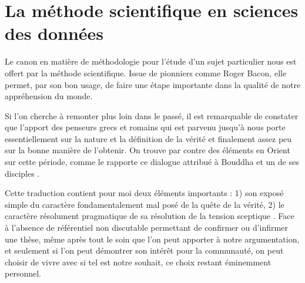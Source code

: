 \chapter{ \nmu La méthode scientifique en sciences des données} \label{chap:methode}

Le canon en matière de méthodologie pour l'étude d'un sujet particulier nous est offert par la méthode scientifique. Issue de pionniers comme Roger Bacon\cite{bacon1878novum}, elle permet, par son bon usage, de faire une étape importante dans la qualité de notre appréhension du monde.

Si l'on cherche à remonter plus loin dans le passé, il est remarquable de constater que l'apport des penseurs grecs et romains qui est parvenu jusqu'à nous porte essentiellement sur la nature et la définition de la vérité et finalement assez peu sur la bonne manière de l’obtenir. On trouve par contre des éléments en Orient sur cette période, comme le rapporte ce dialogue attribué à Bouddha et un de ses disciples .

Cette traduction contient pour moi deux éléments importants : 1) son exposé simple du caractère fondamentalement mal posé de la quête de la vérité, 2) le caractère résolument pragmatique de sa résolution de la \og tension sceptique \fg. Face à l'absence de référentiel non discutable permettant de confirmer ou d'infirmer une thèse, même après tout le soin que l'on peut apporter à notre argumentation, et seulement si l'on peut démontrer son intérêt pour la communauté, on peut choisir de vivre avec si tel est notre souhait, ce choix restant éminemment personnel.

